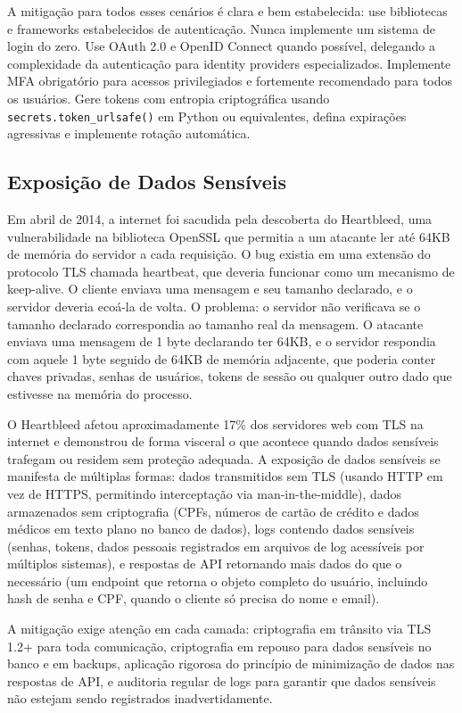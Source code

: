 A mitigação para todos esses cenários é clara e bem estabelecida: use
bibliotecas e frameworks estabelecidos de autenticação. Nunca implemente um
sistema de login do zero. Use OAuth 2.0 e OpenID Connect quando possível,
delegando a complexidade da autenticação para identity providers especializados.
Implemente MFA obrigatório para acessos privilegiados e fortemente recomendado
para todos os usuários. Gere tokens com entropia criptográfica usando
\texttt{secrets.token\_urlsafe()} em Python ou equivalentes, defina expirações
agressivas e implemente rotação automática.

\subsection{Exposição de Dados Sensíveis}

Em abril de 2014, a internet foi sacudida pela descoberta do Heartbleed, uma
vulnerabilidade na biblioteca OpenSSL que permitia a um atacante ler até 64KB
de memória do servidor a cada requisição. O bug existia em uma extensão do
protocolo TLS chamada heartbeat, que deveria funcionar como um mecanismo de
keep-alive. O cliente enviava uma mensagem e seu tamanho declarado, e o servidor
deveria ecoá-la de volta. O problema: o servidor não verificava se o tamanho
declarado correspondia ao tamanho real da mensagem. O atacante enviava uma
mensagem de 1 byte declarando ter 64KB, e o servidor respondia com aquele 1
byte seguido de 64KB de memória adjacente, que poderia conter chaves
privadas, senhas de usuários, tokens de sessão ou qualquer outro dado que
estivesse na memória do processo.

O Heartbleed afetou aproximadamente 17\% dos servidores web com TLS na internet
e demonstrou de forma visceral o que acontece quando dados sensíveis trafegam ou
residem sem proteção adequada. A exposição de dados sensíveis se manifesta de
múltiplas formas: dados transmitidos sem TLS (usando HTTP em vez de HTTPS,
permitindo interceptação via man-in-the-middle), dados armazenados sem
criptografia (CPFs, números de cartão de crédito e dados médicos em texto plano
no banco de dados), logs contendo dados sensíveis (senhas, tokens, dados pessoais
registrados em arquivos de log acessíveis por múltiplos sistemas), e respostas de
API retornando mais dados do que o necessário (um endpoint que retorna o objeto
completo do usuário, incluindo hash de senha e CPF, quando o cliente só precisa
do nome e email).

A mitigação exige atenção em cada camada: criptografia em trânsito via TLS 1.2+
para toda comunicação, criptografia em repouso para dados sensíveis no banco e em
backups, aplicação rigorosa do princípio de minimização de dados nas respostas de
API, e auditoria regular de logs para garantir que dados sensíveis não estejam
sendo registrados inadvertidamente.

